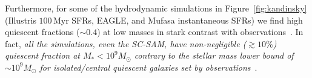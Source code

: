\documentclass[tighten, preprint]{aastex62}
\begin{document}
Furthermore, for some of the hydrodynamic simulations in Figure~\ref{fig:kandinsky}
(Illustris $100\,\mathrm{Myr}$ SFRs, EAGLE, and {\sc Mufasa} instantaneous SFRs)
we find high quiescent fractions (${\sim}0.4$) at low masses in stark contrast with 
observations~\citep{baldry2006,peng2010,hahn2015}. In fact, \emph{all the 
simulations, even the SC-SAM, have non-negligible (${\gtrsim}10\%$) quiescent 
fraction at $M_*{<}10^9 M_\odot$ contrary to the stellar mass lower bound 
of ${\sim}10^9M_\odot$ for isolated/central quiescent galaxies set by 
observations}~\citep{geha2012}. 
\end{document}
